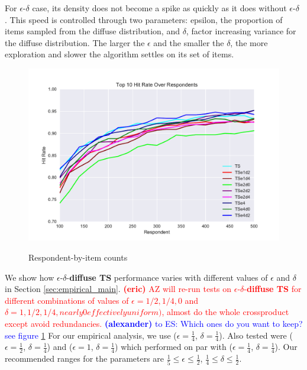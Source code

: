 \documentclass[nonblindrev]{informs3}
\newcommand{\alexander}[1]{\textcolor{blue}{\textbf{(alexander)} #1}}
\newcommand{\eric}[1]{\textcolor{red}{\textbf{(eric)} #1}}
\newcommand{\edts}{$\epsilon$-$\delta$-\textbf{diffuse TS} }
\begin{document}
For $\epsilon$-$\delta$ case, its density does not become a spike as quickly as it does without $\epsilon$-$\delta$ . This speed is controlled through two parameters: epsilon, the proportion of items sampled from the diffuse distribution, and $\delta$, factor increasing variance for the diffuse distribution.  The larger the $\epsilon$ and the smaller the $\delta$, the more exploration and slower the algorithm settles on its set of items. 

\begin{figure}[!ht]
\caption{Respondent-by-item counts}
\includegraphics[width=1\textwidth]{plots/hr120v20k10ed.pdf}
\label{fig:ed}
\end{figure}

We show how \edts performance varies with different values of $\epsilon$ and $\delta$ in Section \ref{sec:empirical_main}. \eric{ AZ will re-run tests on \edts for different combinations of values of $\epsilon=1/2,1/4,0$ and $\delta=1,1/2,1/4,nearly 0 effectively uniform)$, almost do the whole crossproduct except avoid redundancies.} \alexander{to ES: Which ones do you want to keep? see figure \ref{fig:ed}}  For our empirical analysis, we use ($\epsilon=\frac{1}{4}$, $\delta=\frac{1}{4}$). Also tested were ($\epsilon=\frac{1}{2}$, $\delta=\frac{1}{4}$) and ($\epsilon=1$, $\delta=\frac{1}{4}$) which performed on par with ($\epsilon=\frac{1}{4}$, $\delta=\frac{1}{4}$). Our recommended ranges for the parameters are $\frac{1}{5}\leq \epsilon \leq \frac{1}{2}$, $\frac{1}{4}\leq \delta \leq \frac{1}{2}$.\\
\end{document}
